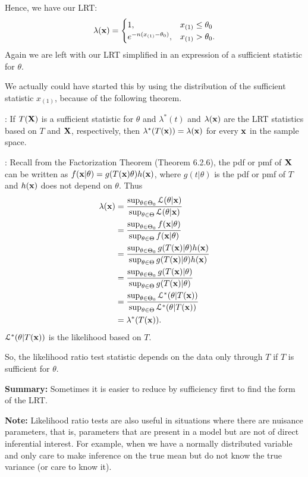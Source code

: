\documentclass[11pt,]{article}
\def\bx{{\bf x}}
\def\bX{{\bf X}}
\def\Lsc{{\cal L}}
\begin{document}
Hence, we have our LRT: \[\lambda(\bx) = \begin{cases}
1, & x_{(1)} \leq \theta_0\\
e^{-n(x_{(1)} - \theta_0)}, & x_{(1)} > \theta_0.
\end{cases}
\] Again we are left with our LRT simplified in an expression of a
sufficient statistic for \(\theta\).

We actually could have started this by using the distribution of the
sufficient statistic \(x_{(1)}\), because of the following theorem.

: If
\(T(\bX)\) is a sufficient statistic for \(\theta\) and \(\lambda^*(t)\)
and \(\lambda(\bx)\) are the LRT statistics based on \(T\) and \(\bX\),
respectively, then \(\lambda^*(T(\bx)) = \lambda(\bx)\) for every
\(\bx\) in the sample space.

: Recall from the Factorization Theorem (Theorem
6.2.6), the pdf or pmf of \(\bX\) can be written as
\(f(\bx|\theta) = g(T(\bx)\theta) h(\bx)\), where \(g(t|\theta)\) is the
pdf or pmf of \(T\) and \(h(\bx)\) does not depend on \(\theta\). Thus
\begin{align*}
\lambda(\bx) &= \frac{\sup_{\theta \in\Theta_0} \Lsc(\theta | \bx)}{\sup_{\theta \in \Theta} \Lsc(\theta | \bx)}\\
&= \frac{\sup_{\theta \in\Theta_0} f(\bx | \theta )}{\sup_{\theta \in \Theta} f( \bx|\theta)}\\
&= \frac{\sup_{\theta \in\Theta_0} g(T(\bx) | \theta )h(\bx)}{\sup_{\theta \in \Theta} g(T( \bx)|\theta)h(\bx)}\\
&= \frac{\sup_{\theta \in\Theta_0} g(T(\bx) | \theta )}{\sup_{\theta \in \Theta} g(T( \bx)|\theta)}\\
&= \frac{\sup_{\theta \in\Theta_0} \Lsc^*(\theta | T(\bx)  )}{\sup_{\theta \in \Theta} \Lsc^*(\theta|T( \bx))}\\
&= \lambda^*(T(\bx)).
\end{align*} \(\Lsc^*(\theta|T(\bx))\) is the likelihood based on \(T\).

So, the likelihood ratio test statistic depends on the data only through
\(T\) if \(T\) is sufficient for \(\theta\).

\noindent \textbf{Summary:} Sometimes it is easier to reduce by
sufficiency first to find the form of the LRT.

\noindent \textbf{Note:} Likelihood ratio tests are also useful in
situations where there are nuisance parameters, that is, parameters that
are present in a model but are not of direct inferential interest. For
example, when we have a normally distributed variable and only care to
make inference on the true mean but do not know the true variance (or
care to know it).
\end{document}
